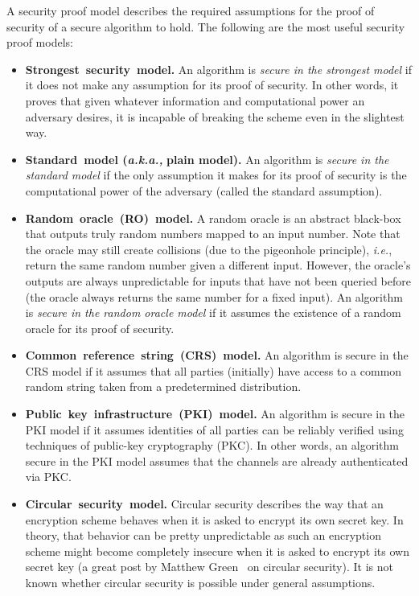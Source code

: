 \documentclass[10pt]{article}
\newcommand{\ie}{\textit{i.e.}}
\theoremstyle{plain}
\begin{document}
A security proof model describes the required assumptions for the
proof of security of a secure algorithm to hold. The following are
the most useful security proof models:
\begin{itemize}
	\item \textbf{Strongest~security~model.} An algorithm is \emph{secure
		in the strongest model} if it does not make any assumption for its
	proof of security. In other words, it proves that given whatever information
	and computational power an adversary desires, it is incapable of breaking
	the scheme even in the slightest way.
	
	\item \textbf{Standard~model (}\textbf{\emph{a.k.a.,}}\textbf{ plain model).}
	An algorithm is \emph{secure in the standard model} if the only assumption
	it makes for its proof of security is the computational power of the
	adversary (called the standard assumption).
	
	\item \textbf{Random~oracle~(RO)~model.} A random oracle is an abstract black-box
	that outputs truly random numbers mapped to an input number. Note that the oracle may still create collisions (due to the pigeonhole principle), \ie, return the same random number given a different input. However, the oracle's outputs are always unpredictable for inputs that have not been queried before (the oracle always returns the same number for a fixed input).
	An algorithm is \emph{secure in the random oracle model} if it assumes the existence of a random oracle for its proof of security.
	
	\item \textbf{Common~reference~string~(CRS)~model.} An algorithm is
	secure in the CRS model if it assumes that all parties (initially) have access
	to a common random string taken from a predetermined distribution.
	\item \textbf{Public~key~infrastructure~(PKI)~model.} An algorithm is
	secure in the PKI model if it assumes identities of all parties can
	be reliably verified using techniques of public-key cryptography (PKC).
	In other words, an algorithm secure in the PKI model assumes that
	the channels are already authenticated via PKC.
	
	\item \textbf{Circular~security~model.} Circular security describes the
	way that an encryption scheme behaves when it is asked to encrypt
	its own secret key. In theory, that behavior can be pretty unpredictable
	as such an encryption scheme might become completely insecure when
	it is asked to encrypt its own secret key (a great post by Matthew
	Green~\cite{green:2012:circular:security} on circular security).
	It is not known whether circular security is possible under general
	assumptions.
\end{itemize}
\end{document}
